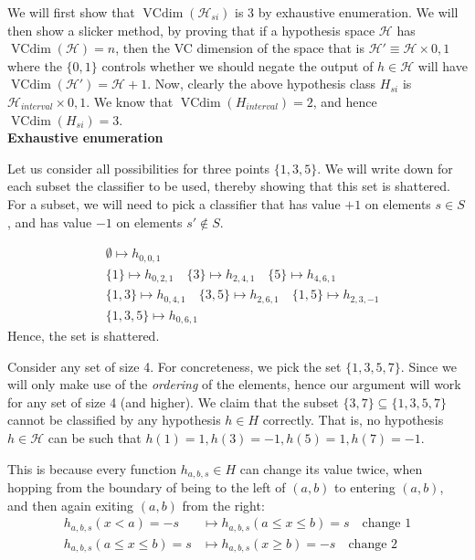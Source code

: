 \documentclass[11pt]{article}
\renewcommand{\H}{\ensuremath{\mathcal{H}}}
\DeclareMathOperator{\vcdim}{VCdim}
\newcommand{\vc}{\ensuremath{\vcdim}}
\begin{document}
We will first show that $\vc(\H_{si})$ is 3 by exhaustive enumeration. We will
then show a slicker method, by proving that if a hypothesis space $\H$
has $\vcdim(\H) = n$, then the VC dimension of the space that is $\H' \equiv \H \times {0, 1}$
where the $\{0, 1\}$ controls whether we should negate the output of $h \in \H$
will have $\vcdim(\H') = \H+1$. Now, clearly the above hypothesis class $H_{si}$
is $\H_{interval} \times{0, 1}$. We know that $\vc(H_{interval}) = 2$, and
hence $\vc(H_{si}) = 3$. \\

\textbf{Exhaustive enumeration}

Let us consider all possibilities for three points $\{ 1, 3, 5 \}$. We will 
write down for each subset the classifier to be used, thereby showing that
this set is shattered. For a subset, we will need to pick a classifier that
has value $+1$ on elements $s \in S$, and has value $-1$ on elements $s' \not \in S$.

\begin{align*}
    &\emptyset \mapsto h_{0, 0, 1} \\
    &\{ 1 \} \mapsto h_{0, 2, 1} \quad
    \{ 3 \} \mapsto h_{2, 4, 1} \quad
    \{ 5 \} \mapsto h_{4, 6, 1} \\
    &\{ 1, 3 \} \mapsto h_{0, 4, 1} \quad
    \{ 3, 5 \} \mapsto h_{2, 6, 1} \quad
    \{ 1, 5 \} \mapsto h_{2, 3, -1} \\
    &\{1, 3, 5\} \mapsto h_{0, 6, 1}
\end{align*}
Hence, the set is shattered.

Consider any set of size 4. For concreteness, we pick the set $\{1, 3, 5, 7\}$.
Since we will only make use of the \emph{ordering} of the elements, hence our argument
will work for any set of size 4 (and higher).
We claim that the subset $\{3, 7\} \subseteq \{1, 3, 5, 7\}$ cannot be classified
by any hypothesis $h \in H$ correctly. That is,  no hypothesis $h \in \H$ can
be such that  $h(1) = 1, h(3) = -1, h(5) = 1, h(7) = -1$.

This is because every function $h_{a, b, s} \in H$ can change its value twice, when
hopping from the boundary of being to the left of $(a, b)$ to entering $(a, b)$,
and then again exiting $(a, b)$ from the right:
\begin{align*}
h_{a, b, s}(x < a) = -s  &\mapsto h_{a, b, s}(a \leq x \leq b) = s \quad \text{change 1} \\
h_{a, b, s}(a \leq x \leq b) = s &\mapsto h_{a, b, s}(x \geq b) = -s \quad \text{change 2}
\end{align*}
\end{document}
